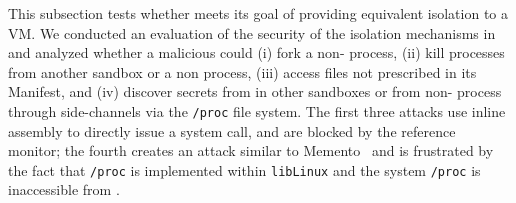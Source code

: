 \begin{comment}
In our design, only trusted applications such as system utilities can run as a non-\sysname{} \picoproc{}, as they need many more functionality that the \sysname{} Linux ABI support. From a security standpoint, nothing prevents a \sysname{} \picoprocs{} from acting maliciously, as application code runs unmodified in \sysname{}.  However, it is important to note that \sysname{}’s goal is not to secure a system but to isolate applications in a competitive level compared to the VM alternative. 
\end{comment}



\vspace{5pt}
 This subsection tests whether \sysname{} meets its goal of providing equivalent isolation
to a VM.
We conducted an evaluation of the security of the isolation mechanisms in \sysname{} and analyzed whether a malicious \sysname{} \picoproc{} could 
(i) fork a non-\sysname{} process, 
(ii)  kill processes from another sandbox or a non \sysname{} process, 
(iii) access files not prescribed in its Manifest, and 
(iv) discover secrets from \picoprocs{} in other sandboxes or from non-\sysname{} process through side-channels via the {\tt /proc} file system. 
The first three attacks use inline assembly to directly issue a system call, and are blocked by the reference monitor; the fourth creates
an attack similar to Memento~\citep{memento} and is frustrated by the fact that {\tt /proc} is implemented within {\tt libLinux} and
the system {\tt /proc} is inaccessible from \sysname{}.

